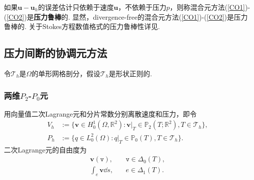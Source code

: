 如果$\boldsymbol{u}-\boldsymbol{u}_h$的误差估计只依赖于速度$\boldsymbol{u}$，不依赖于压力$p$，则称混合元方法(\ref{CO1})-(\ref{CO2})是\textbf{压力鲁棒}的. 显然，divergence-free的混合元方法(\ref{CO1})-(\ref{CO2})是压力鲁棒的. 关于Stokes方程数值格式的压力鲁棒性详见\cite{JohnLinkeMerdonNeilanEtAl2017}.

\subsection{压力间断的协调元方法}
 
令$\mathcal{T}_h$是$\Omega$的单形网格剖分，假设$\mathcal{T}_h$是形状正则的.


\subsubsection{两维$P_2$-$P_0$元}
用向量值二次Lagrange元和分片常数分别离散速度和压力，即令
\begin{align*}
 V_{h}&:=\{\boldsymbol{v}\in H_{0}^{1}(\Omega,\mathbb{R}^{2}): \boldsymbol{v}|_T\in \mathbb P_2(T;\mathbb{R}^{2}), T\in \mathcal{T}_h\},
\\
P_{h}&:=\{q\in L_{0}^2(\Omega): q|_T\in \mathbb P_0(T), T\in \mathcal{T}_h\}.
\end{align*}
二次Lagrange元的自由度为
\begin{subequations}\label{quadLagrangeDoF}
\begin{align}
\label{quadLagrangeDoF1}
\boldsymbol{v}(\texttt{v}), &\quad \texttt{v}\in\Delta_0(T), \\
\label{quadLagrangeDoF2}
\int_{e}\boldsymbol{v}\dd s, &\quad e\in\Delta_1(T).
\end{align}
\end{subequations}

